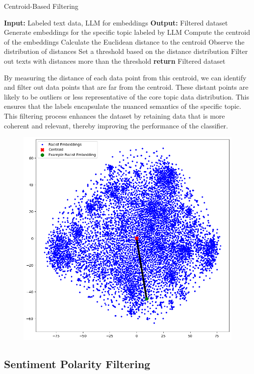 \documentclass[preprint]{article}
\begin{document}
\begin{algorithm}[H]
  \caption{Centroid-Based Filtering}
  \label{alg:centroid_filtering}
  \begin{algorithmic}[1]
    \State \textbf{Input:} Labeled text data, LLM for embeddings
    \State \textbf{Output:} Filtered dataset
    \State Generate embeddings for the specific topic labeled by LLM
    \State Compute the centroid of the embeddings
      \State Calculate the Euclidean distance to the centroid
    \EndFor
    \State Observe the distribution of distances
    \State Set a threshold based on the distance distribution
    \State Filter out texts with distances more than the threshold
    \State \textbf{return} Filtered dataset
  \end{algorithmic}
\end{algorithm}


By measuring the distance of each data point from this centroid, we can identify and filter out data points that are far from the centroid. These distant points are likely to be outliers or less representative of the core topic data distribution. This ensures that the labels encapsulate the nuanced semantics of the specific topic. This filtering process enhances the dataset by retaining data that is more coherent and relevant, thereby improving the performance of the classifier.

\begin{figure}[h]
  \centering
  \includegraphics[width=0.6\linewidth]{img/centroid-distance.png}
\end{figure}

\subsection{Sentiment Polarity Filtering}
\end{document}
